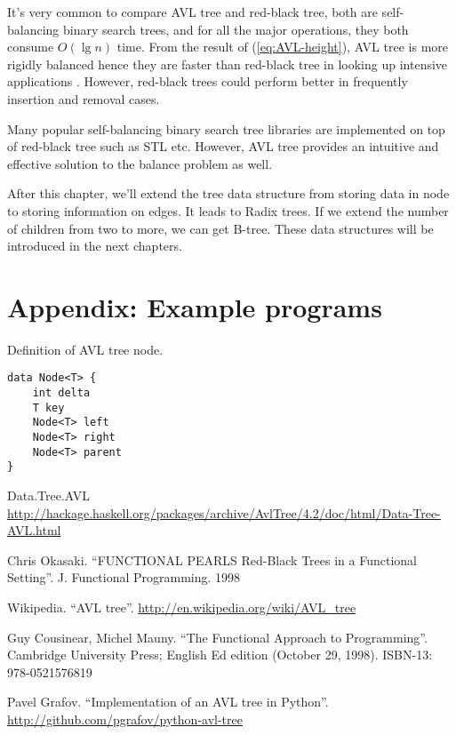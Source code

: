 \documentclass[b5paper]{article}
\begin{document}
It's very common to compare AVL tree and red-black tree, both are self-balancing binary search trees, and for all the major operations, they both consume $O(\lg n)$ time. From the result of (\ref{eq:AVL-height}), AVL tree is more rigidly balanced hence they are faster than red-black tree in looking up intensive applications \cite{wiki-avl}. However, red-black trees could perform better in frequently insertion and removal cases.

Many popular self-balancing binary search tree libraries are implemented on top of red-black tree such as STL etc. However, AVL tree provides an intuitive and effective solution to the balance problem as well.

After this chapter, we'll extend the tree data structure from storing data in node to storing information on edges. It leads to Radix trees. If we extend the number of children from two to more, we can get B-tree. These data structures will be introduced in the next chapters.

\section{Appendix: Example programs}

Definition of AVL tree node.

\begin{lstlisting}[language = Bourbaki]
data Node<T> {
    int delta
    T key
    Node<T> left
    Node<T> right
    Node<T> parent
}
\end{lstlisting}


\begin{thebibliography}{99}

Data.Tree.AVL \url{http://hackage.haskell.org/packages/archive/AvlTree/4.2/doc/html/Data-Tree-AVL.html}

Chris Okasaki. ``FUNCTIONAL PEARLS Red-Black Trees in a Functional Setting''. J. Functional Programming. 1998

Wikipedia. ``AVL tree''. \url{http://en.wikipedia.org/wiki/AVL_tree}

Guy Cousinear, Michel Mauny. ``The Functional Approach to Programming''. Cambridge University Press; English Ed edition (October 29, 1998). ISBN-13: 978-0521576819

Pavel Grafov. ``Implementation of an AVL tree in Python''. \url{http://github.com/pgrafov/python-avl-tree}
\end{thebibliography}

\ifx\wholebook\relax\else
\end{document}
